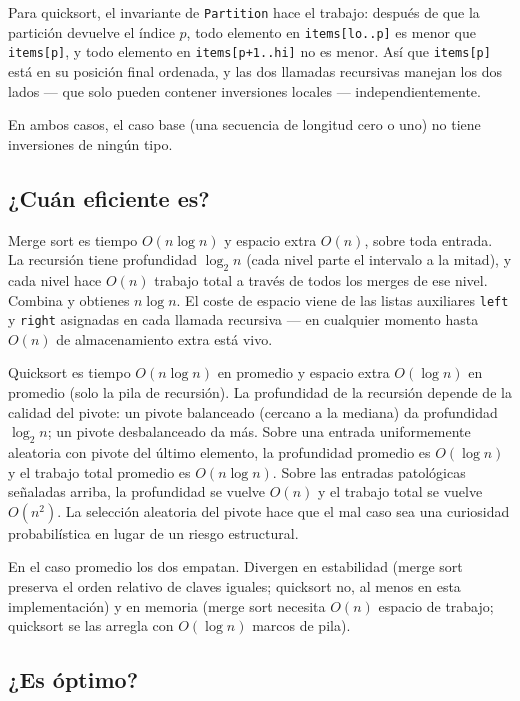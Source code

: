 \documentclass[11pt,a4paper]{article}
\begin{document}
Para quicksort, el invariante de \texttt{Partition} hace el trabajo: después de que la partición devuelve el índice $p$, todo elemento en \texttt{items[lo..p]} es menor que \texttt{items[p]}, y todo elemento en \texttt{items[p+1..hi]} no es menor. Así que \texttt{items[p]} está en su posición final ordenada, y las dos llamadas recursivas manejan los dos lados --- que solo pueden contener inversiones locales --- independientemente.

En ambos casos, el caso base (una secuencia de longitud cero o uno) no tiene inversiones de ningún tipo.

\subsection*{¿Cuán eficiente es?}

Merge sort es tiempo $O(n \log n)$ y espacio extra $O(n)$, sobre toda entrada. La recursión tiene profundidad $\log_2 n$ (cada nivel parte el intervalo a la mitad), y cada nivel hace $O(n)$ trabajo total a través de todos los merges de ese nivel. Combina y obtienes $n \log n$. El coste de espacio viene de las listas auxiliares \texttt{left} y \texttt{right} asignadas en cada llamada recursiva --- en cualquier momento hasta $O(n)$ de almacenamiento extra está vivo.

Quicksort es tiempo $O(n \log n)$ en promedio y espacio extra $O(\log n)$ en promedio (solo la pila de recursión). La profundidad de la recursión depende de la calidad del pivote: un pivote balanceado (cercano a la mediana) da profundidad $\log_2 n$; un pivote desbalanceado da más. Sobre una entrada uniformemente aleatoria con pivote del último elemento, la profundidad promedio es $O(\log n)$ y el trabajo total promedio es $O(n \log n)$. Sobre las entradas patológicas señaladas arriba, la profundidad se vuelve $O(n)$ y el trabajo total se vuelve $O(n^2)$. La selección aleatoria del pivote hace que el mal caso sea una curiosidad probabilística en lugar de un riesgo estructural.

En el caso promedio los dos empatan. Divergen en estabilidad (merge sort preserva el orden relativo de claves iguales; quicksort no, al menos en esta implementación) y en memoria (merge sort necesita $O(n)$ espacio de trabajo; quicksort se las arregla con $O(\log n)$ marcos de pila).

\subsection*{¿Es óptimo?}
\end{document}
